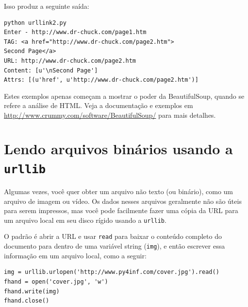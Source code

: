 Isso produz a seguinte saída:

\beforeverb
\begin{verbatim}
python urllink2.py 
Enter - http://www.dr-chuck.com/page1.htm
TAG: <a href="http://www.dr-chuck.com/page2.htm">
Second Page</a>
URL: http://www.dr-chuck.com/page2.htm
Content: [u'\nSecond Page']
Attrs: [(u'href', u'http://www.dr-chuck.com/page2.htm')]
\end{verbatim}
\afterverb

Estes exemplos apenas começam a mostrar o poder da BeautifulSoup, quando se
refere a análise de HTML. Veja a documentação e exemplos em
\url{http://www.crummy.com/software/BeautifulSoup/} para mais detalhes.

\section{Lendo arquivos binários usando a {\tt urllib}}

Algumas vezes, você quer obter um arquivo não texto (ou binário), como um
arquivo de imagem ou vídeo. Os dados nesses arquivos geralmente não são úteis
para serem impressos, mas você pode facilmente fazer uma cópia da URL para um
arquivo local em seu disco rígido usando a {\tt urllib}.

O padrão é abrir a URL e usar {\tt read} para baixar o conteúdo completo do
documento para dentro de uma variável string ({\tt img}), e então escrever
essa informação em um arquivo local, como a seguir:

\beforeverb
\begin{verbatim}
img = urllib.urlopen('http://www.py4inf.com/cover.jpg').read()
fhand = open('cover.jpg', 'w')
fhand.write(img)
fhand.close()
\end{verbatim}
\afterverb

